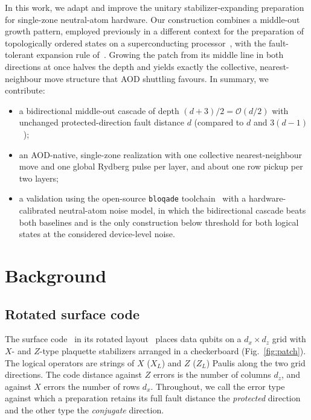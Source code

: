 \documentclass[conference]{IEEEtran}
\newcommand{\bigo}[1]{\mathcal{O}(#1)}
\begin{document}
In this work, we adapt and improve the unitary stabilizer-expanding
preparation for single-zone neutral-atom hardware. Our construction combines a middle-out
growth pattern, employed previously in a different context for the
preparation of topologically ordered states on a superconducting
processor~\cite{satzinger2021topo}, with the fault-tolerant expansion rule
of~\cite{ref:unitaryprep}. Growing the patch from its middle line in both
directions at once halves the depth and yields exactly the collective,
nearest-neighbour move structure that AOD shuttling favours. In summary, we
contribute:
\begin{itemize}
  \item a bidirectional middle-out cascade of depth $(d{+}3)/2=\bigo{d/2}$
        with unchanged protected-direction fault distance $d$ (compared to
        $d$ and $3(d{-}1)$~\cite{ref:unitaryprep});
  \item an AOD-native, single-zone realization with one collective
        nearest-neighbour move and one global Rydberg pulse per layer, and
        about one row pickup per two layers;
  \item a validation using the open-source \texttt{bloqade}
        toolchain~\cite{tool:bloqade} with a hardware-calibrated neutral-atom
        noise model, in which the bidirectional cascade beats both baselines
        and is the only construction below threshold for both logical states
        at the considered device-level noise.
\end{itemize}

\section{Background}\label{sec:background}

\subsection{Rotated surface code}\label{sec:background-code}
The surface code~\cite{bravyi1998boundary,dennis2002topological,fowler2012surface}
in its rotated layout~\cite{bombin2007rotated} places data qubits on a
$d_x\times d_z$ grid with $X$- and $Z$-type plaquette stabilizers arranged in a
checkerboard (Fig.~\ref{fig:patch}). The logical operators are strings of $X$
($X_L$) and $Z$ ($Z_L$) Paulis along the two grid directions. The code distance
against $Z$ errors is the number of columns $d_z$, and against $X$ errors the
number of rows $d_x$. Throughout, we call the error type against which a
preparation retains its full fault distance the \emph{protected} direction and
the other type the \emph{conjugate} direction.
\end{document}
